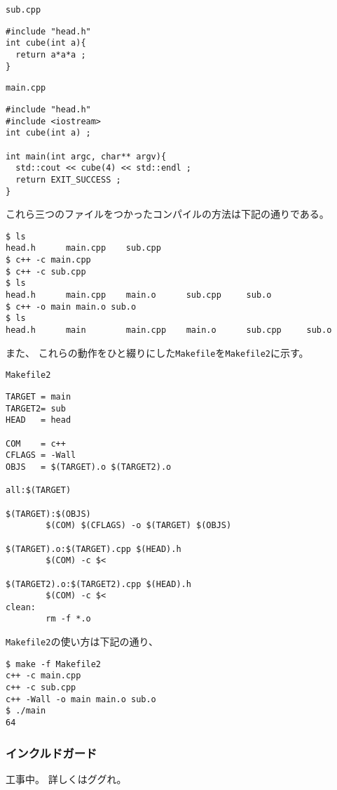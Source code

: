 \begin{itembox}{\texttt{sub.cpp}}
\begin{verbatim}
#include "head.h"
int cube(int a){
  return a*a*a ;
}
\end{verbatim}
\end{itembox}

\begin{itembox}{\texttt{main.cpp}}
\begin{verbatim}
#include "head.h"
#include <iostream>
int cube(int a) ;

int main(int argc, char** argv){
  std::cout << cube(4) << std::endl ;
  return EXIT_SUCCESS ;
}
\end{verbatim}
\end{itembox}

これら三つのファイルをつかったコンパイルの方法は下記の通りである。
\begin{verbatim}
$ ls
head.h		main.cpp	sub.cpp
$ c++ -c main.cpp
$ c++ -c sub.cpp
$ ls
head.h		main.cpp	main.o		sub.cpp		sub.o
$ c++ -o main main.o sub.o
$ ls
head.h		main		main.cpp	main.o		sub.cpp		sub.o
\end{verbatim}



また、
これらの動作をひと綴りにした\texttt{Makefile}を\texttt{Makefile2}に示す。
\begin{itembox}{\texttt{Makefile2}}
 \begin{verbatim}
TARGET = main
TARGET2= sub
HEAD   = head

COM    = c++
CFLAGS = -Wall
OBJS   = $(TARGET).o $(TARGET2).o

all:$(TARGET)

$(TARGET):$(OBJS)
        $(COM) $(CFLAGS) -o $(TARGET) $(OBJS)

$(TARGET).o:$(TARGET).cpp $(HEAD).h
        $(COM) -c $<

$(TARGET2).o:$(TARGET2).cpp $(HEAD).h
        $(COM) -c $<
clean:
        rm -f *.o
 \end{verbatim}
\end{itembox}
\texttt{Makefile2}の使い方は下記の通り、
\begin{verbatim}
$ make -f Makefile2
c++ -c main.cpp
c++ -c sub.cpp
c++ -Wall -o main main.o sub.o
$ ./main
64
\end{verbatim}


\subsubsection{インクルドガード}
工事中。
詳しくはググれ。



